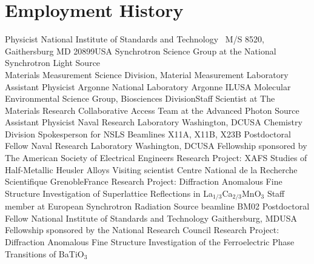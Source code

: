 \documentclass[11pt]{moderncv}
\begin{document}
\maketitle

\section{Employment History}
%
        {Physicist}%
        {\small National Institute of Standards and Technology}%
        {\small ~\hfill\break M/S 8520, Gaithersburg MD 20899}{USA}%
        {Synchrotron Science Group at the National Synchrotron Light Source\\
          Materials Measurement Science Division,
          Material Measurement Laboratory
        }
%
        {Assistant Physicist}%
        {\small Argonne National Laboratory}
        {\small Argonne IL}{USA}%
        {Molecular Environmental Science Group,
          Biosciences Division\newline{}Staff Scientist at The Materials
          Research Collaborative Access Team at the Advanced Photon
          Source
        }
%
%
        {Assistant Physicist}
        {\small Naval Research Laboratory}
        {\small Washington, DC}{USA}
        {Chemistry Division\newline{}
          Spokesperson for NSLS Beamlines X11A, X11B, X23B
        }
%
        {Postdoctoral Fellow}
        {\small Naval Research Laboratory}
        {\small Washington, DC}{USA}
        {Fellowship sponsored by The American Society of Electrical
          Engineers\newline{}
          Research Project: XAFS Studies of Half-Metallic Heusler Alloys
        }
%
        {Visiting scientist}
        {\small Centre National de la Recherche Scientifique}
        {\small Grenoble}{France}
        { Research Project: Diffraction Anomalous Fine Structure
          Investigation of Superlattice Reflections in
          La$_{1/3}$Ca$_{2/3}$MnO$_3$\newline{} 
          Staff member at European Synchrotron Radiation Source
          beamline BM02 
        }
%
        {Postdoctoral Fellow}
        {\small National Institute of Standards and Technology}
        {\small Gaithersburg, MD}{USA}
        {Fellowship sponsored by the National Research
          Council\newline{} 
          Research Project: Diffraction Anomalous Fine Structure
          Investigation 
          of the Ferroelectric Phase Transitions of BaTiO$_3$
        }
\end{document}
